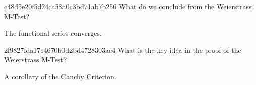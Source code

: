 \begin{note}{c48d5e20f5d24ca58a0c3bd71ab7b256}
    What do we conclude from the Weierstrass M-Test?

    \begin{cloze}{1}
        The functional series converges.
    \end{cloze}
\end{note}

\begin{note}{2f9827fda17c4670b0d2bd4728303ae4}
    What is the key idea in the proof of the Weierstrass M-Test?

    \begin{cloze}{1}
        A corollary of the Cauchy Criterion.
    \end{cloze}
\end{note}


